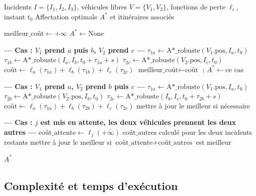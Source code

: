\documentclass[12pt,a4paper]{article}
\theoremstyle{definition}
\theoremstyle{remark}
\begin{document}
\begin{algorithm}[H]
\caption{Affectation initiale pour trois incidents, deux véhicules}
\begin{algorithmic}[1]
\Require Incidents $I = \{I_1,I_2,I_3\}$, véhicules libres $V = \{V_1,V_2\}$,
         fonctions de perte $\ell_i$, instant $t_0$
\Ensure Affectation optimale $A^*$ et itinéraires associés

\State $\text{meilleur\_coût} \gets +\infty$
\State $A^* \gets \text{None}$

    \State \textbf{— Cas : $V_1$ prend $a$ puis $b$, $V_2$ prend $c$ —}
    \State $\tau_{1a} \gets \text{A*\_robuste}(V_1.\text{pos}, I_a, t_0)$
    \State $\tau_{1b} \gets \text{A*\_robuste}(I_a, I_b, t_0 + \tau_{1a} + s)$
    \State $\tau_{2c} \gets \text{A*\_robuste}(V_2.\text{pos}, I_c, t_0)$
    \State $\text{coût} \gets \ell_a(\tau_{1a}) + \ell_b(\tau_{1b}) + \ell_c(\tau_{2c})$
        $\text{meilleur\_coût} \gets \text{coût}$ ; $A^* \gets \text{ce cas}$
    \EndIf

    \State \textbf{— Cas : $V_1$ prend $a$, $V_2$ prend $b$ puis $c$ —}
    \State $\tau_{1a} \gets \text{A*\_robuste}(V_1.\text{pos}, I_a, t_0)$
    \State $\tau_{2b} \gets \text{A*\_robuste}(V_2.\text{pos}, I_b, t_0)$
    \State $\tau_{2c} \gets \text{A*\_robuste}(I_b, I_c, t_0 + \tau_{2b} + s)$
    \State $\text{coût} \gets \ell_a(\tau_{1a}) + \ell_b(\tau_{2b}) + \ell_c(\tau_{2c})$
    \State mettre à jour le meilleur si nécessaire
\EndFor

    \State \textbf{— Cas : $j$ est mis en attente, les deux véhicules
            prennent les deux autres —}
    \State $\text{coût\_attente} \gets \ell_j(+\infty)$ 
    \State $\text{coût\_autres}$ calculé pour les deux incidents restants
    \State mettre à jour le meilleur si $\text{coût\_attente} + \text{coût\_autres}$
            est meilleur
\EndFor

\State \Return $A^*$
\end{algorithmic}
\end{algorithm}

\subsection{Complexité et temps d’exécution}
\end{document}
